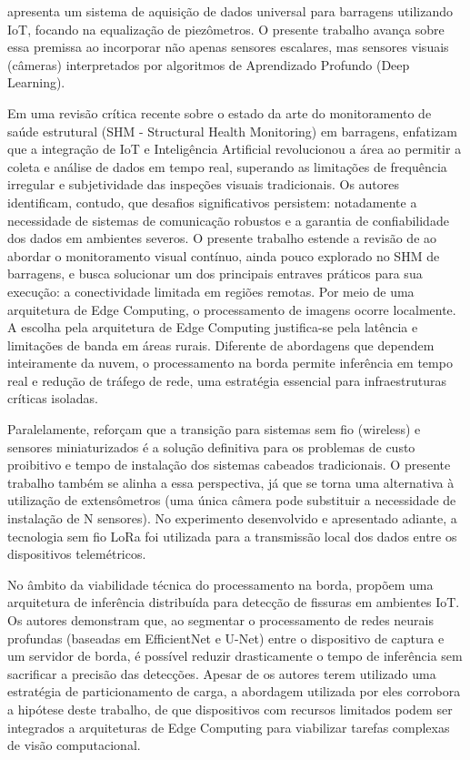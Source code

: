  apresenta um sistema de aquisição de dados universal para barragens utilizando IoT, focando na equalização de piezômetros. O presente trabalho avança sobre essa premissa ao incorporar não apenas sensores escalares, mas sensores visuais (câmeras) interpretados por algoritmos de Aprendizado Profundo (Deep Learning).

Em uma revisão crítica recente sobre o estado da arte do monitoramento de saúde estrutural (SHM - Structural Health Monitoring) em barragens,  enfatizam que a integração de IoT e Inteligência Artificial revolucionou a área ao permitir a coleta e análise de dados em tempo real, superando as limitações de frequência irregular e subjetividade das inspeções visuais tradicionais. Os autores identificam, contudo, que desafios significativos persistem: notadamente a necessidade de sistemas de comunicação robustos e a garantia de confiabilidade dos dados em ambientes severos. O presente trabalho estende a revisão de  ao abordar o monitoramento visual contínuo, ainda pouco explorado no SHM de barragens, e busca solucionar um dos principais entraves práticos para sua execução: a conectividade limitada em regiões remotas. Por meio de uma arquitetura de Edge Computing, o processamento de imagens ocorre localmente. A escolha pela arquitetura de Edge Computing justifica-se pela latência e limitações de banda em áreas rurais. Diferente de abordagens que dependem inteiramente da nuvem, o processamento na borda permite inferência em tempo real e redução de tráfego de rede, uma estratégia essencial para infraestruturas críticas isoladas.

Paralelamente,  reforçam que a transição para sistemas sem fio (wireless) e sensores miniaturizados é a solução definitiva para os problemas de custo proibitivo e tempo de instalação dos sistemas cabeados tradicionais. O presente trabalho também se alinha a essa perspectiva, já que se torna uma alternativa à utilização de extensômetros (uma única câmera pode substituir a necessidade de instalação de N sensores). No experimento desenvolvido e apresentado adiante, a tecnologia sem fio LoRa foi utilizada para a transmissão local dos dados entre os dispositivos telemétricos.

No âmbito da viabilidade técnica do processamento na borda,  propõem uma arquitetura de inferência distribuída para detecção de fissuras em ambientes IoT. Os autores demonstram que, ao segmentar o processamento de redes neurais profundas (baseadas em EfficientNet e U-Net) entre o dispositivo de captura e um servidor de borda, é possível reduzir drasticamente o tempo de inferência sem sacrificar a precisão das detecções. Apesar de os autores terem utilizado uma estratégia de particionamento de carga, a abordagem utilizada por eles corrobora a hipótese deste trabalho, de que dispositivos com recursos limitados podem ser integrados a arquiteturas de Edge Computing para viabilizar tarefas complexas de visão computacional.

